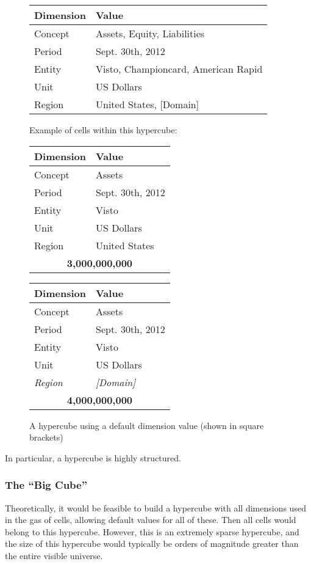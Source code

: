 \documentclass{vldb}
\begin{document}
\begin{figure}
\caption{A hypercube using a default dimension value (shown in square brackets)}
\label{fig-default}
\begin{tabular}{|l|l|}
\hline
Dimension & Value \\
\hline
Concept & Assets, Equity, Liabilities \\
Period & Sept. 30th, 2012 \\
Entity & Visto, Championcard, American Rapid \\
Unit & US Dollars \\
Region & United States, [Domain] \\
\hline
\end{tabular}

Example of cells within this hypercube:

\begin{tabular}{|l|l|}
\hline
Dimension & Value \\
\hline
Concept & Assets \\
Period & Sept. 30th, 2012 \\
Entity & Visto \\
Unit & US Dollars \\
Region & United States \\
\hline
\multicolumn{2}{|c|}{\textbf{3,000,000,000}} \\
\hline
\end{tabular}

\begin{tabular}{|l|l|}
\hline
Dimension & Value \\
\hline
Concept & Assets \\
Period & Sept. 30th, 2012 \\
Entity & Visto \\
Unit & US Dollars \\
\emph{Region} & \emph{[Domain]} \\
\hline
\multicolumn{2}{|c|}{\textbf{4,000,000,000}} \\
\hline
\end{tabular}
\end{figure}

In particular, a hypercube is highly structured.

\subsubsection{The ``Big Cube''}
Theoretically, it would be feasible to build a hypercube with all dimensions used in the gas of cells, allowing default values for all of these. Then all cells would belong to this hypercube. However, this is an extremely sparse hypercube, and the size of this hypercube would typically be orders of magnitude greater than the entire visible universe.
\end{document}
